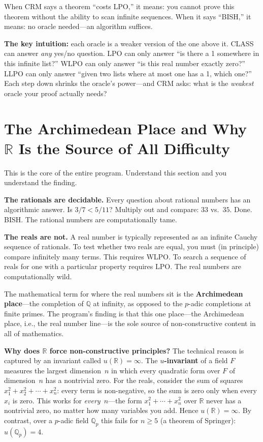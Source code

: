 \documentclass[11pt,twoside,openany]{report}
\theoremstyle{remark}
\newcommand{\BISH}{\textsf{BISH}}
\newcommand{\WLPO}{\textsf{WLPO}}
\newcommand{\LLPO}{\textsf{LLPO}}
\newcommand{\LPO}{\textsf{LPO}}
\newcommand{\CLASS}{\textsf{CLASS}}
\begin{document}
When CRM says a theorem ``costs \LPO,'' it means: you cannot prove this theorem without the ability to scan infinite sequences. When it says ``\BISH,'' it means: no oracle needed---an algorithm suffices.

\textbf{The key intuition:} each oracle is a weaker version of the one above it. \CLASS{} can answer \emph{any} yes/no question. \LPO{} can only answer ``is there a 1 somewhere in this infinite list?'' \WLPO{} can only answer ``is this real number exactly zero?'' \LLPO{} can only answer ``given two lists where at most one has a 1, which one?'' Each step down shrinks the oracle's power---and CRM asks: what is the \emph{weakest} oracle your proof actually needs?


\section{The Archimedean Place and Why $\mathbb{R}$ Is the Source of All Difficulty}

This is the core of the entire program. Understand this section and you understand the finding.

\textbf{The rationals are decidable.} Every question about rational numbers has an algorithmic answer. Is $3/7 < 5/11$? Multiply out and compare: $33$ vs.\ $35$. Done. \BISH. The rational numbers are computationally tame.

\textbf{The reals are not.} A real number is typically represented as an infinite Cauchy sequence of rationals. To test whether two reals are equal, you must (in principle) compare infinitely many terms. This requires \WLPO. To search a sequence of reals for one with a particular property requires \LPO. The real numbers are computationally wild.

The mathematical term for where the real numbers sit is the \textbf{Archimedean place}---the completion of $\mathbb{Q}$ at infinity, as opposed to the $p$-adic completions at finite primes. The program's finding is that this one place---the Archimedean place, i.e., the real number line---is the sole source of non-constructive content in all of mathematics.

\textbf{Why does $\mathbb{R}$ force non-constructive principles?} The technical reason is captured by an invariant called $u(\mathbb{R}) = \infty$. The \textbf{$u$-invariant} of a field $F$ measures the largest dimension~$n$ in which every quadratic form over $F$ of dimension~$n$ has a nontrivial zero. For the reals, consider the sum of squares $x_1^2 + x_2^2 + \cdots + x_n^2$: every term is non-negative, so the sum is zero only when every $x_i$ is zero. This works for \emph{every}~$n$---the form $x_1^2 + \cdots + x_n^2$ over $\mathbb{R}$ never has a nontrivial zero, no matter how many variables you add. Hence $u(\mathbb{R}) = \infty$. By contrast, over a $p$-adic field $\mathbb{Q}_p$ this fails for $n \geq 5$ (a theorem of Springer): $u(\mathbb{Q}_p) = 4$.
\end{document}
